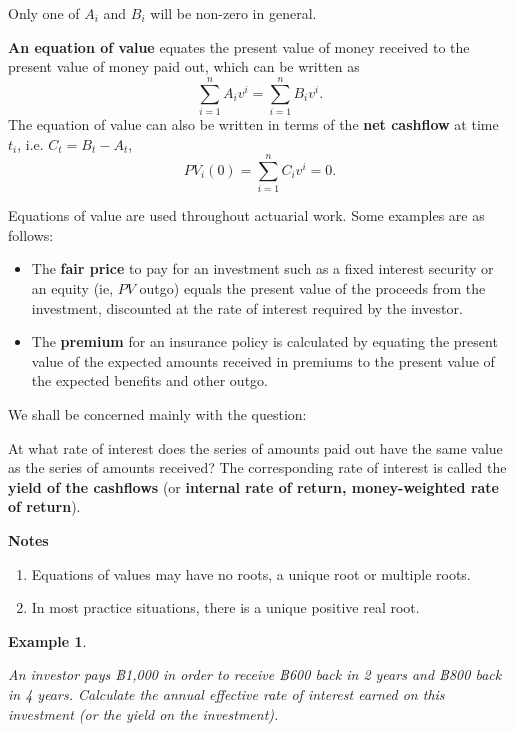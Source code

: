 \documentclass[
]{book}
\theoremstyle{definition}
\theoremstyle{definition}
\newtheorem{example}{Example}[chapter]
\theoremstyle{definition}
\theoremstyle{definition}
\theoremstyle{remark}
\begin{document}
Only one of \(A_i\) and \(B_i\) will be non-zero in general.

\textbf{An equation of value} equates the present value of money received to
the present value of money paid out, which can be written as
\[\sum_{i=1}^n A_i v^i = \sum_{i=1}^n B_i v^i.\] The equation of value
can also be written in terms of the \textbf{net cashflow} at time \(t_i\), i.e.
\(C_t = B_t - A_t\), \[PV_i(0) = \sum_{i=1}^n C_i v^i =0.\]

Equations of value are used throughout actuarial work. Some examples are
as follows:

\begin{itemize}
\item
  The \textbf{fair price} to pay for an investment such as a fixed interest
  security or an equity (ie, \(PV\) outgo) equals the present value of
  the proceeds from the investment, discounted at the rate of interest
  required by the investor.
\item
  The \textbf{premium} for an insurance policy is calculated by equating
  the present value of the expected amounts received in premiums to
  the present value of the expected benefits and other outgo.
\end{itemize}

We shall be concerned mainly with the question:

At what rate of interest does the series of amounts paid out have the
same value as the series of amounts received? The corresponding rate of
interest is called the \textbf{yield of the cashflows} (or \textbf{internal rate of
return, money-weighted rate of return}).

\textbf{Notes}

\begin{enumerate}
\def\labelenumi{\arabic{enumi}.}
\item
  Equations of values may have no roots, a unique root or multiple
  roots.
\item
  In most practice situations, there is a unique positive real root.
\end{enumerate}

\begin{example}
\protect\hypertarget{exm:unlabeled-div-46}{}\label{exm:unlabeled-div-46}

\emph{An investor pays ฿1,000 in order to receive ฿600 back in 2 years and
฿800 back in 4 years. Calculate the annual effective rate of interest
earned on this investment (or the yield on the investment).}

\end{example}
\end{document}
